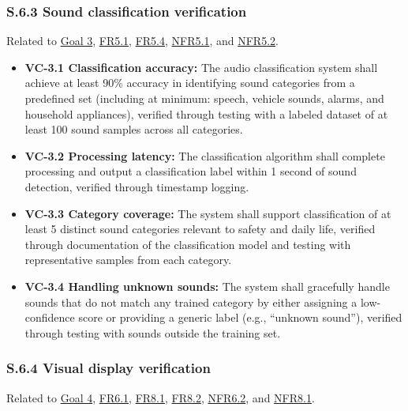 \documentclass[12pt]{article}
\theoremstyle{definition}
\begin{document}
\subsubsection{S.6.3 Sound classification verification}

Related to \hyperref[goal:audio_identification_analysis]{Goal 3},
\hyperref[FR5_1]{FR5.1}, \hyperref[FR5_4]{FR5.4}, \hyperref[NFR5_1]{NFR5.1}, and
\hyperref[NFR5_2]{NFR5.2}.

\begin{itemize}
\item \textbf{VC-3.1 Classification accuracy:} The audio classification system
shall achieve at least 90\% accuracy in identifying sound categories from a
predefined set (including at minimum: speech, vehicle sounds, alarms, and
household appliances), verified through testing with a labeled dataset of at
least 100 sound samples across all categories.

\item \textbf{VC-3.2 Processing latency:}\label{sec:VC-3.2} The classification 
algorithm shall complete processing and output a classification label within 1 
second of sound detection, verified through timestamp logging.

\item \textbf{VC-3.3 Category coverage:} The system shall support classification
of at least 5 distinct sound categories relevant to safety and daily life,
verified through documentation of the classification model and testing with
representative samples from each category.

\item \textbf{VC-3.4 Handling unknown sounds:} The system shall gracefully
handle sounds that do not match any trained category by either assigning a
low-confidence score or providing a generic label (e.g., ``unknown sound''),
verified through testing with sounds outside the training set.
\end{itemize}

\subsubsection{S.6.4 Visual display verification}

Related to \hyperref[goal:visual_display]{Goal 4}, \hyperref[FR6_1]{FR6.1},
\hyperref[FR8_1]{FR8.1}, \hyperref[FR8_2]{FR8.2}, \hyperref[NFR6_2]{NFR6.2}, and
\hyperref[NFR8_1]{NFR8.1}.
\end{document}
